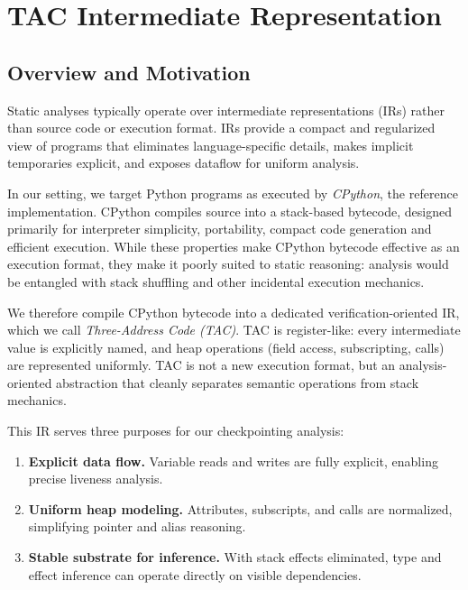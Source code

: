 \newpage

\section{TAC Intermediate Representation}
\label{sec:appendix-tac-ir}

\subsection{Overview and Motivation}

Static analyses typically operate over intermediate representations (IRs) rather than source code or execution format. IRs provide a compact and regularized view of programs that eliminates language-specific details, makes implicit temporaries explicit, and exposes dataflow for uniform analysis.

In our setting, we target Python programs as executed by \emph{CPython}, the reference implementation.  
CPython compiles source into a stack-based bytecode, designed primarily for interpreter simplicity, portability, compact code generation and efficient execution. 
While these properties make CPython bytecode effective as an execution format, they make it poorly suited to static reasoning: analysis would be entangled with stack shuffling and other incidental execution mechanics.

We therefore compile CPython bytecode into a dedicated verification-oriented IR, which we call \emph{Three-Address Code (TAC)}.  
TAC is register-like: every intermediate value is explicitly named, and heap operations (field access, subscripting, calls) are represented uniformly.  
TAC is not a new execution format, but an analysis-oriented abstraction that cleanly separates semantic operations from stack mechanics.

This IR serves three purposes for our checkpointing analysis:
\begin{enumerate}
    \item \textbf{Explicit data flow.} Variable reads and writes are fully explicit, enabling precise liveness analysis.
    \item \textbf{Uniform heap modeling.} Attributes, subscripts, and calls are normalized, simplifying pointer and alias reasoning.
    \item \textbf{Stable substrate for inference.} With stack effects eliminated, type and effect inference can operate directly on visible dependencies.
\end{enumerate}

